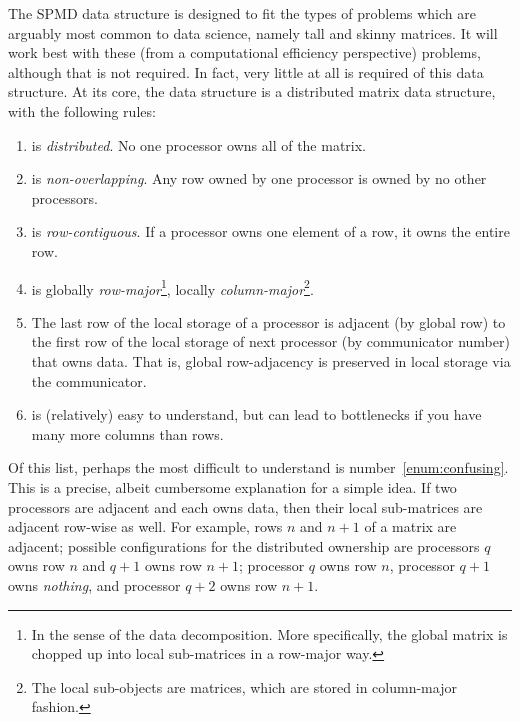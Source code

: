 The SPMD data structure is designed to fit the types of problems which
are arguably most common to data science, namely tall and skinny matrices.
It will work best with these (from a computational efficiency perspective)
problems, although that is not required. In fact, very little at all is
required of this data structure. At its core, the data structure is a
distributed matrix data structure, with the following rules:
  \begin{enumerate}
    \item {} is \emph{distributed}. No one processor owns all of
          the matrix.
    \item {} is \emph{non-overlapping}. Any row owned by one
          processor is owned by no other processors.
    \item {} is \emph{row-contiguous}. If a processor owns one
          element of a row, it owns the entire row.
    \item {} is globally \emph{row-major}\footnote{In the sense of
          the data decomposition. More specifically, the global matrix is
          chopped up into local sub-matrices in a row-major way.},
          locally \emph{column-major}\footnote{The local sub-objects are
           matrices, which are stored in column-major fashion.}.
    \item The last row of the local storage of a processor is adjacent
          (by global row) to the first row of the local storage of next
          processor (by communicator number) that owns data. That is, global
          row-adjacency is preserved in local storage via the
          communicator.\label{enum:confusing}
    \item {} is (relatively) easy to understand, but can lead to
          bottlenecks if you have many more columns than rows.
  \end{enumerate}

Of this list, perhaps the most difficult to understand is
number~\ref{enum:confusing}. This is a precise, albeit cumbersome explanation
for a simple idea. If two processors are adjacent and each owns data,
then their local sub-matrices are adjacent row-wise as well. For example,
rows $n$ and $n+1$ of a matrix are adjacent; possible configurations for
the distributed ownership are processors $q$ owns row $n$ and $q+1$ owns
row $n+1$; processor $q$ owns row $n$, processor $q+1$ owns \emph{nothing},
and processor $q+2$ owns row $n+1$.

